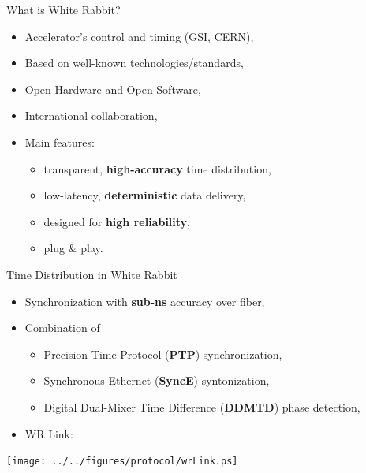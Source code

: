 \documentclass[compress,red]{beamer}
\begin{document}
% 
% 
\begin{frame}{What is White Rabbit?}

  \begin{itemize}
    \item Accelerator's control and timing (GSI, CERN),
    \item Based on well-known technologies/standards,
    \item Open Hardware and Open Software,
    \item International collaboration,
    \item Main features:
	\begin{itemize}
	  \item transparent,  {\bf high-accuracy} time distribution,
	  \item low-latency,  {\bf deterministic} data delivery,
	  \item designed for  {\bf high reliability},
	  \item plug \& play.
	\end{itemize}
  \end{itemize}

\end{frame}
\begin{frame}{Time Distribution in White Rabbit}

  \begin{itemize}
    \item Synchronization with {\bf sub-ns} accuracy over fiber,
    \item Combination of
	\begin{itemize}
	  \item Precision Time Protocol ({\bf PTP}) synchronization,
	  \item Synchronous Ethernet ({\bf SyncE}) syntonization,
	  \item Digital Dual-Mixer Time Difference ({\bf DDMTD}) phase detection,
	\end{itemize}
    \item WR Link:
  \end{itemize}

  \begin{center}
  \texttt{[image: ../../figures/protocol/wrLink.ps]}
  \end{center}

\end{frame}
\end{document}

